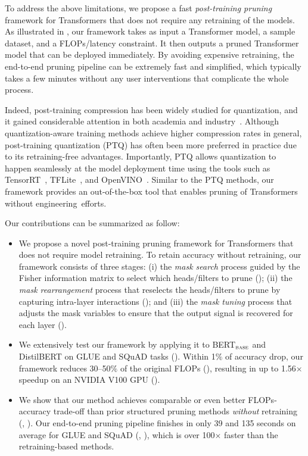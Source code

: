 To address the above limitations, we propose a fast \textit{post-training pruning} framework for Transformers that does not require any retraining of the models.
As illustrated in , our framework takes as input a Transformer model, a sample dataset, and a FLOPs/latency constraint.
It then outputs a pruned Transformer model that can be deployed immediately.
By avoiding expensive retraining, the end-to-end pruning pipeline can be extremely fast and simplified, which typically takes a few minutes without any user interventions that complicate the whole process.

Indeed, post-training compression has been widely studied for quantization, and it gained considerable attention in both academia and industry~\cite{banner2018post,hubara2020improving,zhao2019improving}. 
Although quantization-aware training methods
achieve higher compression rates in general, post-training quantization (PTQ) has often been more preferred in practice due to its retraining-free advantages.
Importantly, PTQ allows quantization to happen seamlessly at the model deployment time using the tools such as TensorRT~\cite{tensorrt}, TFLite~\cite{tflite}, and OpenVINO~\cite{openvino}.
Similar to the PTQ methods, our framework provides an out-of-the-box tool that enables pruning of Transformers without engineering~efforts.

Our contributions can be summarized as follow:
\vspace{-2mm}
\begin{itemize}[leftmargin=*]
    \item We propose a novel post-training pruning framework for Transformers that does not require model retraining.
    To retain accuracy without retraining, our framework consists of three stages:
    (i) the \textit{mask search} process guided by the Fisher information matrix to select which heads/filters to prune ();
    (ii) the \textit{mask rearrangement} process that reselects the heads/filters to prune by capturing intra-layer interactions ();
    and (iii) the \textit{mask tuning }process that adjusts the mask variables to ensure that the output signal is recovered for each layer ().
    
    \item We extensively test our framework by applying it to BERT$_\textsc{base}$ and DistilBERT on GLUE and SQuAD tasks ().
    Within 1$\%$ of accuracy drop, our framework reduces 30--50$\%$ of the original FLOPs (), resulting in up to 1.56$\times$ speedup on an NVIDIA V100 GPU ().
    \item We show that our method achieves comparable or even better FLOPs-accuracy trade-off than prior structured pruning methods \textit{without} retraining (, ).
    Our end-to-end pruning pipeline finishes in only 39 and 135 seconds on average for GLUE and SQuAD (, ), which is over 100$\times$ faster than the retraining-based methods.
\end{itemize}
